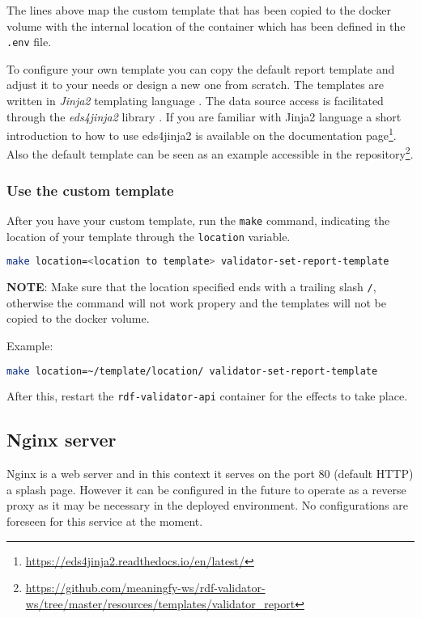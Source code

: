 	The lines above map the custom template that has been copied to the docker volume with the internal location of the container which has been defined in the \texttt{.env} file.
	
	To configure your own template you can copy the default report template and adjust it to your needs or design a new one from scratch. 
	The templates are written in \textit{Jinja2} templating language \citep{jinja2}. The data source access is facilitated through the \textit{eds4jinja2} library \citep{eds4jinja2}. If you are familiar with Jinja2 language a short introduction to how to use eds4jinja2 is available on the documentation page\footnote{\url{https://eds4jinja2.readthedocs.io/en/latest/}}. Also the default template can be seen as an example accessible in the repository\footnote{\url{https://github.com/meaningfy-ws/rdf-validator-ws/tree/master/resources/templates/validator_report}}.
		
	\subsubsection{Use the custom template}
	After you have your custom template, run the \texttt{make} command, indicating the location of your template through the \texttt{location} variable.
	\begin{lstlisting}[language=bash]
make location=<location to template> validator-set-report-template
	\end{lstlisting}

	\textbf{NOTE}: Make sure that the location specified ends with a trailing slash \texttt{/}, otherwise the command will not work propery and the templates will not be copied to the docker volume.

	Example:
	\begin{lstlisting}[language=bash]
make location=~/template/location/ validator-set-report-template
	\end{lstlisting}

	After this, restart the \texttt{rdf-validator-api} container for the effects to take place.


	\subsection{Nginx server}
	
	Nginx is a web server and in this context it serves on the port 80 (default HTTP) a splash page. However it can be configured in the future to operate as a reverse proxy as it may be necessary in the deployed environment. No configurations are foreseen for this service at the moment. 
	
